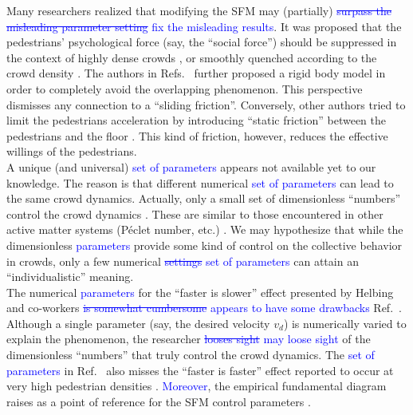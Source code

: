 \documentclass[preprint,12pt]{elsarticle}
\begin{document}
Many researchers realized that modifying the SFM may (partially)
\textcolor{blue}{\sout{ surpass the misleading parameter setting}
fix the misleading results}. It was proposed that the pedestrians' 
psychological force (say, the ``social force'') should be suppressed in the 
context of highly dense crowds 
\cite{pelechano_2007,moussaid_2011,alonso_2014,bottinelli_2017}, or smoothly 
quenched according to the crowd density \cite{song_2019}. The authors in 
Refs.~\cite{kabalan_2017,jebrane_2019} further proposed a rigid body model in 
order to completely avoid the overlapping phenomenon. This perspective 
dismisses 
any connection to a ``sliding friction''. Conversely, other authors tried to 
limit the pedestrians acceleration by introducing ``static friction'' between 
the pedestrians and the floor \cite{wang_2019}. This kind of friction, however, 
reduces the effective willings of the pedestrians.  \\  

A unique (and universal) \textcolor{blue}{set of parameters} appears not
available yet to our knowledge. 
 The reason is that different numerical \textcolor{blue}{set of parameters} can lead to 
the same crowd dynamics. Actually, only a small set of dimensionless 
``numbers'' control the crowd dynamics \cite{dorso_2019}. These are similar to 
those encountered in other active matter systems (P\'eclet number, etc.)  
\cite{marchetti_2014}. We may hypothesize that while the dimensionless 
\textcolor{blue}{parameters} provide some kind of control on the 
collective behavior in 
crowds, only a few numerical \textcolor{blue}{\sout{settings} set of parameters} can attain an ``individualistic'' 
meaning. 
 \\

The numerical \textcolor{blue}{parameters} for the ``faster is slower'' effect presented by 
Helbing and co-workers \textcolor{blue}{\sout{is somewhat cumbersome} appears to have some drawbacks} 
Ref.~\cite{helbing_2000,dorso_2017,dorso_2019}. Although a single 
parameter (say, the desired velocity $v_d$) is numerically varied to 
explain the phenomenon, the researcher \textcolor{blue}{\sout{looses sight} may loose sight} of the dimensionless 
``numbers'' that truly control the crowd dynamics. The \textcolor{blue}{set of parameters} in 
Ref.~\cite{helbing_2000} also misses the ``faster is faster'' effect reported 
to occur at very high pedestrian densities \cite{dorso_2017,haghani_2019}. 
\textcolor{blue}{Moreover}, the empirical fundamental diagram raises as a point of reference 
for the SFM control parameters \cite{helbing_2007,dorso_2017}. \\
\end{document}
